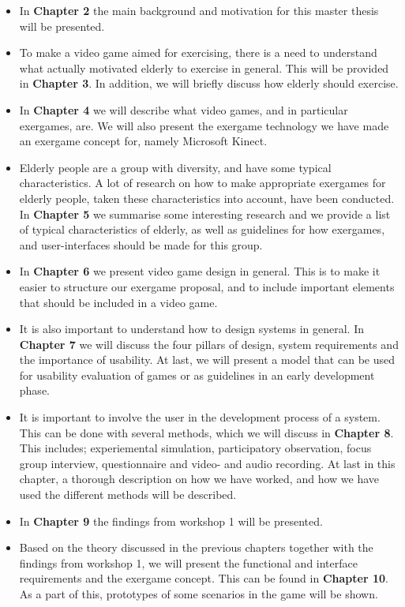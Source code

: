 \begin{itemize}
\item In \textbf{Chapter 2} the main background and motivation for this master thesis will be presented.
\item To make a video game aimed for exercising, there is a need to understand what actually motivated elderly to exercise in general. This will be provided in \textbf{Chapter 3}. In addition, we will briefly discuss how elderly should exercise.
\item In \textbf{Chapter 4} we will describe what video games, and in particular exergames, are. We will also present the exergame technology we have made an exergame concept for, namely Microsoft Kinect.
\item Elderly people are a group with diversity, and have some typical characteristics. A lot of research on how to make appropriate exergames for elderly people, taken these characteristics into account, have been conducted. In \textbf{Chapter 5} we summarise some interesting research and we provide a list of typical characteristics of elderly, as well as guidelines for how exergames, and user-interfaces should be made for this group.  
\item In \textbf{Chapter 6} we present video game design in general. This is to make it easier to structure our exergame proposal, and to include important elements that should be included in a video game.
\item It is also important to understand how to design systems in general. In \textbf{Chapter 7} we will discuss the four pillars of design, system requirements and the importance of usability. At last, we will present a model that can be used for usability evaluation of games or as guidelines in an early development phase. 
\item  It is important to involve the user in the development process of a system. This can be done with several methods, which we will discuss in \textbf{Chapter 8}. This includes; experiemental simulation, participatory observation, focus group interview, questionnaire and video- and audio recording. At last in this chapter, a thorough description on how we have worked, and how we have used the different methods will be described.
\item In \textbf{Chapter 9} the findings from workshop 1 will be presented.
\item Based on the theory discussed in the previous chapters together with the findings from workshop 1, we will present the functional and interface requirements and the exergame concept. This can be found in \textbf{Chapter 10}. As a part of this, prototypes of some scenarios in the game will be shown.

\end{itemize}
